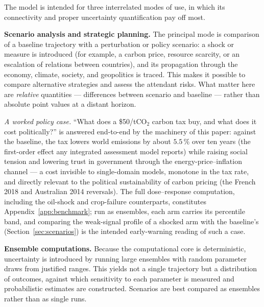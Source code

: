 \documentclass[a4paper,fleqn]{cas-sc}
\begin{document}
The model is intended for three interrelated modes of use, in which its connectivity and proper
uncertainty quantification pay off most.

\textbf{Scenario analysis and strategic planning.} The principal mode is comparison of a baseline
trajectory with a perturbation or policy scenario: a shock or measure is introduced (for example, a
carbon price, resource scarcity, or an escalation of relations between countries), and its
propagation through the economy, climate, society, and geopolitics is traced. This makes it possible
to compare alternative strategies and assess the attendant risks. What matter here are
\emph{relative} quantities --- differences between scenario and baseline --- rather than absolute
point values at a distant horizon.

\emph{A worked policy case.} ``What does a \$50/tCO$_2$ carbon tax buy, and what does it cost
politically?'' is answered end-to-end by the machinery of this paper: against the baseline, the
tax lowers world emissions by about $5.5\,\%$ over ten years (the first-order effect any integrated
assessment model reports) while raising social tension and lowering trust in government through
the energy-price--inflation channel --- a cost invisible to single-domain models, monotone in the
tax rate, and directly relevant to the political sustainability of carbon pricing (the French 2018
and Australian 2014 reversals). The full dose--response computation, including the oil-shock and
crop-failure counterparts, constitutes Appendix~\ref{app:benchmark}; run as ensembles, each arm
carries its percentile band, and comparing the weak-signal profile of a shocked arm with the
baseline's (Section~\ref{sec:scenarios}) is the intended early-warning reading of such a case.

\textbf{Ensemble computations.} Because the computational core is deterministic, uncertainty is
introduced by running large ensembles with random parameter draws from justified ranges. This yields
not a single trajectory but a distribution of outcomes, against which sensitivity to each parameter
is measured and probabilistic estimates are constructed. Scenarios are best compared as ensembles
rather than as single runs.
\end{document}
